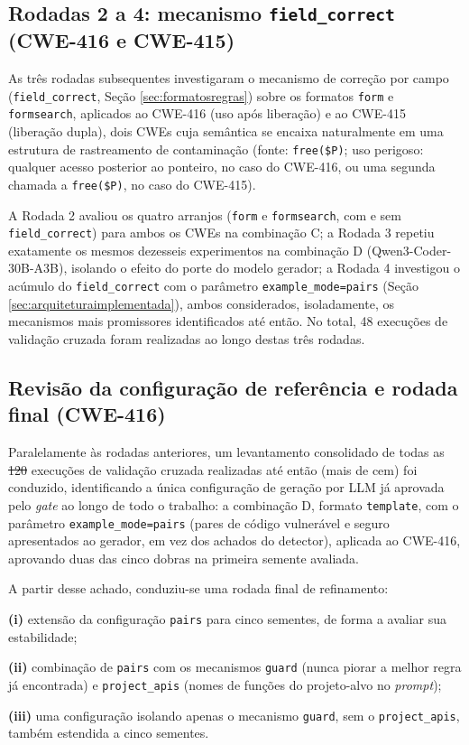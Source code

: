 \documentclass[
    12pt,                %
    openright,           %
    oneside,             %
    a4paper,             %
    english,             %
    brazil               %
]{abntex2}
\newcommand{\antigo}[1]{\sout{#1}}
\newcommand{\novo}[1]{{\color{red}#1}}
\begin{document}
\subsection{Rodadas 2 a 4: mecanismo \texttt{field\_correct} (CWE-416 e CWE-415)}
\label{sec:rodadas234}
\par
As três rodadas subsequentes investigaram o mecanismo de correção por campo (\texttt{field\_correct}, Seção \ref{sec:formatosregras}) sobre os formatos \texttt{form} e \texttt{formsearch}, aplicados ao CWE-416 (uso após liberação) e ao CWE-415 (liberação dupla), dois CWEs cuja semântica se encaixa naturalmente em uma estrutura de rastreamento de contaminação (fonte: \texttt{free(\$P)}; uso perigoso: qualquer acesso posterior ao ponteiro, no caso do CWE-416, ou uma segunda chamada a \texttt{free(\$P)}, no caso do CWE-415).
\par
A Rodada 2 avaliou os quatro arranjos (\texttt{form} e \texttt{formsearch}, com e sem \texttt{field\_correct}) para ambos os CWEs na combinação C; a Rodada 3 repetiu exatamente os mesmos dezesseis experimentos na combinação D (Qwen3-Coder-30B-A3B), isolando o efeito do porte do modelo gerador; a Rodada 4 investigou o acúmulo do \texttt{field\_correct} com o parâmetro \texttt{example\_mode=pairs} (Seção \ref{sec:arquiteturaimplementada}), ambos considerados, isoladamente, os mecanismos mais promissores identificados até então.
No total, 48 execuções de validação cruzada foram realizadas ao longo destas três rodadas.

\subsection{Revisão da configuração de referência e rodada final (CWE-416)}
\label{sec:rodadafinal}
\par
Paralelamente às rodadas anteriores, um levantamento consolidado de todas as \antigo{120 }execuções de validação cruzada realizadas até então\novo{ (mais de cem)} foi conduzido, identificando a única configuração \novo{de geração por LLM }já aprovada pelo \textit{gate} ao longo de todo o trabalho: a combinação D, formato \texttt{template}, com o parâmetro \texttt{example\_mode=pairs} (pares de código vulnerável e seguro apresentados ao gerador, em vez dos achados do detector), aplicada ao CWE-416, aprovando duas das cinco dobras na primeira semente avaliada.
\par
A partir desse achado, conduziu-se uma rodada final de refinamento: 
\par
\textbf{(i)} extensão da configuração \texttt{pairs} para cinco sementes, de forma a avaliar sua estabilidade; 
\par
\textbf{(ii)} combinação de \texttt{pairs} com os mecanismos \texttt{guard} (nunca piorar a melhor regra já encontrada) e \texttt{project\_apis} (nomes de funções do projeto-alvo no \textit{prompt}); 
\par
\textbf{(iii)} uma configuração isolando apenas o mecanismo \texttt{guard}, sem o \texttt{project\_apis}, também estendida a cinco sementes.
\end{document}
